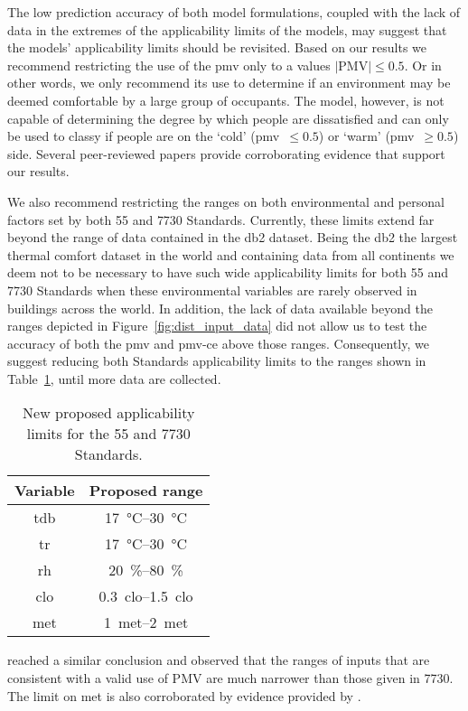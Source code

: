 The low prediction accuracy of both model formulations, coupled with the lack of data in the extremes of the applicability limits of the models, may suggest that the models' applicability limits should be revisited.
Based on our results we recommend restricting the use of the \ac{pmv} only to a values $\lvert \textrm{PMV}\lvert \leq 0.5$.
Or in other words, we only recommend its use to determine if an environment may be deemed comfortable by a large group of occupants.
The model, however, is not capable of determining the degree by which people are dissatisfied and can only be used to classy if people are on the `cold' (\ac{pmv}~$\leq 0.5$) or `warm' (\ac{pmv}~$\geq 0.5$) side.
Several peer-reviewed papers \cite{Cheung2019, Yao2022, kim2019thermal, tartarini2018thermal, Humphreys2002, doherty_evaluation_1988, tartarini_prediction_2023} provide corroborating evidence that support our results.

We also recommend restricting the ranges on both environmental and personal factors set by both \gls{55} and \gls{7730} Standards.
Currently, these limits extend far beyond the range of data contained in the \ac{db2} dataset.
Being the \ac{db2} the largest thermal comfort dataset in the world and containing data from all continents we deem not to be necessary to have such wide applicability limits for both \gls{55} and \gls{7730} Standards when these environmental variables are rarely observed in buildings across the world.
In addition, the lack of data available beyond the ranges depicted in Figure~\ref{fig:dist_input_data} did not allow us to test the accuracy of both the \ac{pmv} and \ac{pmv-ce} above those ranges.
Consequently, we suggest reducing both Standards applicability limits to the ranges shown in Table~\ref{tab:ranges}, until more data are collected.
\begin{table}[htb!]
    \centering
    \begin{tabular}{cc}
        \toprule
        Variable & Proposed range \\
        \midrule
        \ac{tdb} & \qtyrange{17}{30}{\celsius} \\
        \ac{tr} & \qtyrange{17}{30}{\celsius} \\
        \ac{rh} & \qtyrange{20}{80}{\percent} \\
        \ac{clo} & \qtyrange{0.3}{1.5}{clo} \\
        \ac{met} & \qtyrange{1}{2}{met} \\
        \bottomrule
    \end{tabular}
    \caption{New proposed applicability limits for the \gls{55} and \gls{7730} Standards.}
    \label{tab:ranges}
\end{table}
 reached a similar conclusion and observed that the ranges of inputs that are consistent with a valid use of PMV are much narrower than those given in \gls{7730}.
The limit on \ac{met} is also corroborated by evidence provided by .

